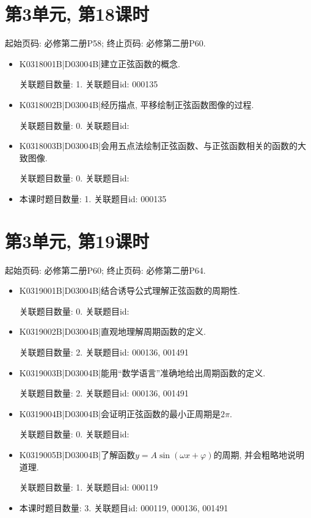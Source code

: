 \section*{第3单元, 第18课时}
起始页码: 必修第二册P58; 终止页码: 必修第二册P60.
\begin{itemize}
\item K0318001B|D03004B|建立正弦函数的概念.

关联题目数量: 1. 关联题目id: 000135

\item K0318002B|D03004B|经历描点, 平移绘制正弦函数图像的过程.

关联题目数量: 0. 关联题目id: 

\item K0318003B|D03004B|会用五点法绘制正弦函数、与正弦函数相关的函数的大致图像.

关联题目数量: 0. 关联题目id: 

\item 本课时题目数量: 1. 关联题目id: 000135

\end{itemize}

\section*{第3单元, 第19课时}
起始页码: 必修第二册P60; 终止页码: 必修第二册P64.
\begin{itemize}
\item K0319001B|D03004B|结合诱导公式理解正弦函数的周期性.

关联题目数量: 0. 关联题目id: 

\item K0319002B|D03004B|直观地理解周期函数的定义.

关联题目数量: 2. 关联题目id: 000136, 001491

\item K0319003B|D03004B|能用``数学语言''准确地给出周期函数的定义.

关联题目数量: 2. 关联题目id: 000136, 001491

\item K0319004B|D03004B|会证明正弦函数的最小正周期是$2\pi$.

关联题目数量: 0. 关联题目id: 

\item K0319005B|D03004B|了解函数$y=A\sin(\omega x+\varphi)$的周期, 并会粗略地说明道理.

关联题目数量: 1. 关联题目id: 000119

\item 本课时题目数量: 3. 关联题目id: 000119, 000136, 001491

\end{itemize}

